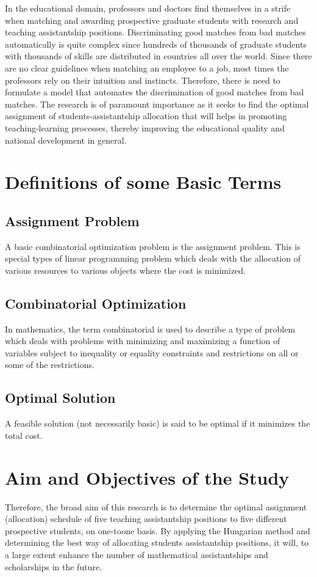 \documentclass[11pt]{report}
\newcommand{\NI}{\noindent}
\begin{document}
	\NI In the educational domain, professors and doctors find themselves in a strife when matching and awarding prospective graduate students with research and teaching assistantship positions. Discriminating good matches from bad matches automatically is quite complex since hundreds of thousands of graduate students with thousands of skills are distributed in countries all over the world. Since there are no clear guidelines when matching an employee to a job, most times the
	professors rely on their intuition and instincts. Therefore, there is need to formulate a model that automates the discrimination of good matches from bad matches. The research is of paramount importance as it seeks to find the optimal assignment of students-assistantship allocation that will
	helps in promoting teaching-learning processes, thereby improving the educational quality and national development in general.
	
	\section{Definitions of some Basic Terms}
	\subsection{Assignment Problem}
	A basic combinatorial optimization problem is the assignment problem. This is special types of linear programming problem which deals with the allocation of various
	resources to various objects where the cost is minimized.
	
	\subsection{Combinatorial Optimization}
	In mathematics, the term combinatorial is used to describe a type of problem which deals with problems with minimizing and maximizing a function of variables subject to inequality or equality constraints and restrictions on all or some of the restrictions.
	
	\subsection{Optimal Solution}
	A feasible solution (not necessarily basic) is said to be optimal if it minimizes
	the total cost.
	
	\section{Aim and Objectives of the Study}
	Therefore, the broad aim of this research is to determine the optimal assignment (allocation) schedule of five teaching assistantship positions to five different prospective students, on one-toone basis. By applying the Hungarian method and determining the best way of allocating students assistantship positions, it will, to a large extent enhance the number of mathematical assistantships and scholarships in the future.
	
\end{document}
